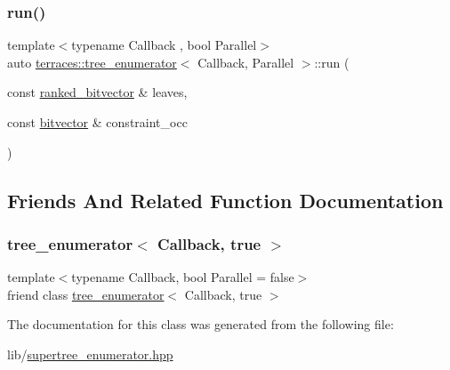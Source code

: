 \subsubsection{\texorpdfstring{run()}{run()}\hspace{0.1cm}{\footnotesize\ttfamily [3/3]}}
{\footnotesize\ttfamily template$<$typename Callback , bool Parallel$>$ \\
auto \hyperlink{classterraces_1_1tree__enumerator}{terraces\+::tree\+\_\+enumerator}$<$ Callback, Parallel $>$\+::run (\begin{DoxyParamCaption}\item[{const \hyperlink{namespaceterraces_acc45ec9c561024c50ecbce5b6738ba08}{ranked\+\_\+bitvector} \&}]{leaves,  }\item[{const \hyperlink{namespaceterraces_a1b526fb554dff829f7ad51eb21d5ed06}{bitvector} \&}]{constraint\+\_\+occ }\end{DoxyParamCaption})}



\subsection{Friends And Related Function Documentation}
\mbox{\label{classterraces_1_1tree__enumerator_a9233453e725dd710bc8d92a5291f832b}} 
\subsubsection{\texorpdfstring{tree\+\_\+enumerator$<$ Callback, true $>$}{tree\_enumerator< Callback, true >}}
{\footnotesize\ttfamily template$<$typename Callback, bool Parallel = false$>$ \\
friend class \hyperlink{classterraces_1_1tree__enumerator}{tree\+\_\+enumerator}$<$ Callback, true $>$\hspace{0.3cm}{\ttfamily [friend]}}



The documentation for this class was generated from the following file\+:\begin{DoxyCompactItemize}
\item 
lib/\hyperlink{supertree__enumerator_8hpp}{supertree\+\_\+enumerator.\+hpp}\end{DoxyCompactItemize}
